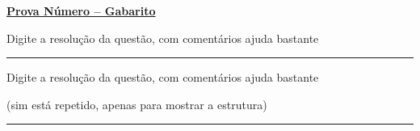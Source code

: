 \documentclass{provas}
\begin{document}
\pagestyle{empty}

\cabecagab

\vspace{0.5cm}
\begin{center}
 \textbf{\underline{Prova Número -- Gabarito}}
\end{center}

\vspace{0.5cm}

Digite a resolução da questão, com comentários ajuda bastante

\begin{center}
 \rule{0.5\textwidth}{0.02cm}
\end{center}


Digite a resolução da questão, com comentários ajuda bastante

(sim está repetido, apenas para mostrar a estrutura)

\begin{center}
 \rule{0.5\textwidth}{0.02cm}
\end{center}
\end{document}
